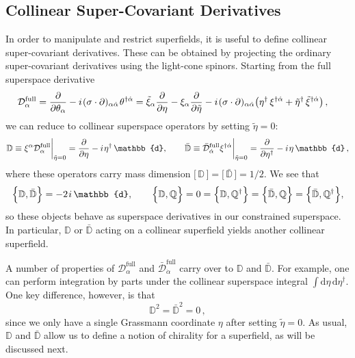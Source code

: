 \documentclass[12pt,document,nofootinbib,superscriptaddress,onecolumn,preprintnumbers,balancelastpage]{article}
\newcommand{\s}{\hspace{0.8pt}}
\newcommand{\PP}{\mathbb{d}}
\newcommand{\D}{\mathbb{D}}
\newcommand{\Q}{\mathbb{Q}}
\begin{document}
\begin{spacing}{1.2}
\subsection{Collinear Super-Covariant Derivatives}

In order to manipulate and restrict superfields, it is useful to define collinear super-covariant derivatives.
%
These can be obtained by projecting the ordinary super-covariant derivatives using the light-cone spinors.
%
Starting from the full superspace derivative
%
\begin{align}
&\mathcal{D}_\alpha^\text{full} = \frac{\partial }{\partial \theta_\alpha} - i \s (\sigma \cdot \partial)_{\alpha \dot{\alpha}}\s \theta^{\dagger \dot{\alpha}} =  \tilde{\xi}_\alpha \frac{\partial}{\partial \eta} - \xi_\alpha \frac{\partial}{\partial \tilde{\eta}} -i\s (\sigma \cdot \partial)_{\alpha \dot{\alpha}} \big(\eta^\dagger \,\xi^{\dagger \dot{\alpha}} + \tilde{\eta}^\dagger\, \tilde{\xi}^{\dagger \dot{\alpha}}\big) \, , 
\end{align}
we can reduce to collinear superspace operators by setting $\tilde{\eta} = 0$:
\begin{align}
\D \equiv \xi^\alpha \mathcal{D}_\alpha^\text{full}  \bigg|_{\tilde{\eta} = 0}  = \frac{\partial}{\partial \eta} - i\s \eta^\dagger\, \PP,  \qquad \bar{\D} \equiv \bar{\mathcal{D}}_{\dot{\alpha}}^\text{full} \xi^{\dagger \dot{\alpha}}  \bigg|_{\tilde{\eta} = 0}  =   \frac{\partial}{\partial \eta^\dagger} - i\s \eta\, \PP\, ,
\label{eq:defDDBar}
\end{align}
where these operators carry mass dimension $\big[\,\D\,\big] =  \big[\,\bar{\D}\,\big] = 1/2$. 
%
We see that
\begin{align}
\Big\{ \D, \bar{\D} \Big \}  = -2\s i\, \PP, \qquad \Big\{\D, \Q\Big\} = 0 = \Big\{\D, \Q^\dagger\Big\} = \Big\{\bar{\D}, \Q\Big\} = \Big\{\bar{\D}, \Q^\dagger\Big\},
\end{align}
so these objects behave as superspace derivatives in our constrained superspace.
%
In particular, $\D$ or $\bar{\D}$ acting on a collinear superfield yields another collinear superfield.


A number of properties of $\mathcal{D}_\alpha^\text{full}$ and $\bar{\mathcal{D}}_{\dot{\alpha}}^\text{full}$ carry over to $\D$ and $\bar{\D}$.
%
For example, one can perform integration by parts under the collinear superspace integral $\int \text{d} \eta \, \text{d}\eta^\dagger$.
%
One key difference, however, is that
%
\vspace{-2mm}
\begin{equation}
\D^2 = \bar{\D}^2 = 0\,,
\end{equation}
since we only have a single Grassmann coordinate $\eta$ after setting $\tilde{\eta} = 0$.
%
As usual, $\D$ and $\bar{\D}$ allow us to define a notion of chirality for a superfield, as will be discussed next. 


\end{spacing}
\end{document}
